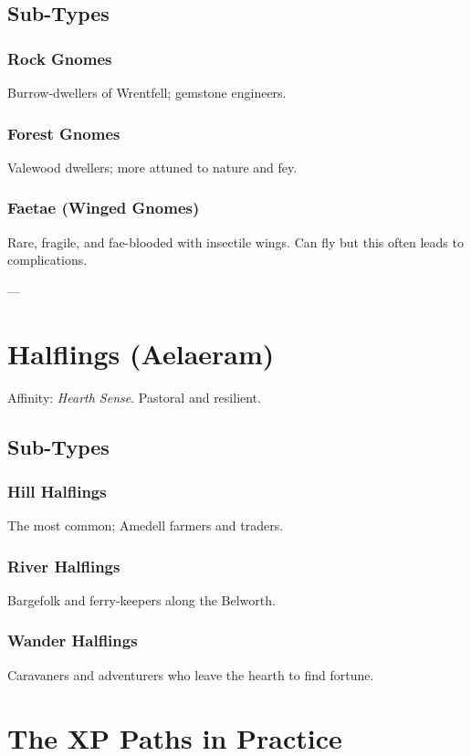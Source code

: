 \documentclass[11pt]{article}
\begin{document}
\subsection{Sub-Types}
\subsubsection{Rock Gnomes}
Burrow-dwellers of Wrentfell; gemstone engineers.  

\subsubsection{Forest Gnomes}
Valewood dwellers; more attuned to nature and fey.  

\subsubsection{Faetae (Winged Gnomes)}
Rare, fragile, and fae-blooded with insectile wings. Can fly but this often leads to complications.  

---

\section{Halflings (Aelaeram)}
Affinity: \emph{Hearth Sense}. Pastoral and resilient.  

\subsection{Sub-Types}
\subsubsection{Hill Halflings}
The most common; Amedell farmers and traders.  

\subsubsection{River Halflings}
Bargefolk and ferry-keepers along the Belworth.  

\subsubsection{Wander Halflings}
Caravaners and adventurers who leave the hearth to find fortune.   

\section{The XP Paths in Practice}
\end{document}
